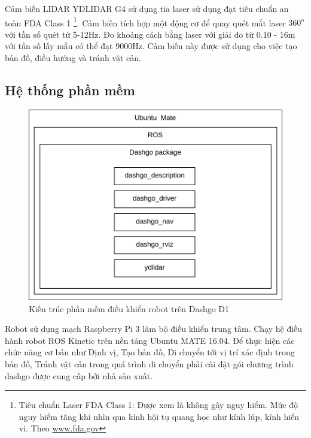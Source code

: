 Cảm biến LIDAR YDLIDAR G4 sử dụng tia laser sử dụng đạt tiêu chuẩn an toàn FDA Class 1 \footnote{Tiêu chuẩn Laser FDA Class 1: Được xem là không gây nguy hiểm. Mức độ nguy hiểm tăng khi nhìn qua kính hội tụ quang học như kính lúp, kính hiển vi. Theo \url{www.fda.gov}}. 
Cảm biến tích hợp một động cơ để quay quét mắt laser ${360}^{o}$ với tần số quét từ 5-12Hz. Đo khoảng cách bằng laser với giải đo từ 0.10 - 16m với tần số lấy mẫu có thể đạt 9000Hz. 
Cảm biến này được sử dụng cho việc tạo bản đồ, điều hướng và tránh vật cản. 


\subsection{Hệ thống phần mềm}

\begin{figure}[htbp]
    \centering
    \includegraphics[width=0.7\linewidth]{figures/dashgo-architecture.png}  
    \caption{Kiến trúc phần mềm điều khiển robot trên Dashgo D1}
    \label{fig:dashgo-architecture}
\end{figure}

Robot sử dụng mạch Raspberry Pi 3 làm bộ điều khiển trung tâm. Chạy hệ điều hành robot ROS Kinetic trên nền tảng Ubuntu MATE 16.04. Để thực hiện các chức năng cơ bản như Định vị, Tạo bản đồ, Di chuyển tới vị trí xác định trong bản đồ, Tránh vật cản trong quá trình di chuyển phải cài đặt gói chương trình dashgo được cung cấp bởi nhà sản xuất. 

